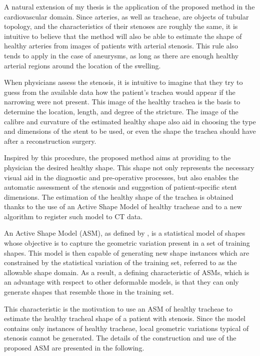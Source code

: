 \documentclass[a4paper]{article}
\begin{document}
A natural extension of my thesis is the application of the proposed method in the cardiovascular domain. Since arteries, as well as tracheae, are objects of tubular topology, and the characteristics of their stenoses are roughly the same, it is intuitive to believe that the method will also be able to estimate the shape of healthy arteries from images of patients with arterial stenosis. This rule also tends to apply in the case of aneurysms, as long as there are enough healthy arterial regions around the location of the swelling.

When physicians
assess the stenosis, it is intuitive to imagine that they try to guess
from the available data how the patient’s trachea would appear if the narrowing
were not present. This image of the healthy trachea is the basis to
determine the location, length, and degree of the stricture. The image of the calibre and curvature of the estimated healthy shape also aid in choosing
the type and dimensions of the stent to be used, or even the shape the
trachea should have after a reconstruction surgery.

Inspired by this procedure, the proposed method aims at providing to
the physician the desired healthy shape. This shape not only represents
the necessary visual aid in the diagnostic and pre-operative processes, but
also enables the automatic assessment of the stenosis and suggestion of
patient-specific stent dimensions. The estimation of the healthy shape of
the trachea is obtained thanks to the use of an Active Shape Model of
healthy tracheae and to a new algorithm to register such model to CT
data.

An Active Shape Model (ASM), as defined by \citet{Cootes}, is
a statistical model of shapes whose objective is to capture the geometric
variation present in a set of training shapes. This model is then capable
of generating new shape instances which are constrained by the statistical
variation of the training set, referred to as the allowable shape domain.
As a result, a defining characteristic of ASMs, which is an advantage with
respect to other deformable models, is that they can only generate shapes
that resemble those in the training set.

This characteristic is the motivation to use an ASM of healthy tracheae
to estimate the healthy tracheal shape of a patient with stenosis. Since the
model contains only instances of healthy tracheae, local geometric variations
typical of stenosis cannot be generated. The details of the construction and
use of the proposed ASM are presented in the following.
\end{document}
